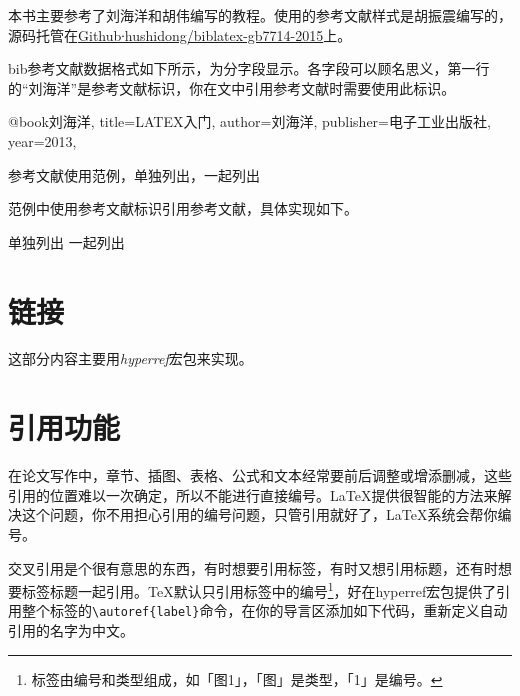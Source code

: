 本书主要参考了刘海洋\cite{刘海洋}和胡伟\cite{胡伟}编写的教程。使用的参考文献样式是胡振震编写的，源码托管在\href{https://github.com/hushidong/biblatex-gb7714-2015}{Github∙hushidong/biblatex-gb7714-2015}上。

\begin{latex}
\usepackage[
    backend=biber,%
    style=gb7714-2015%
    ]{biblatex}


\printbibliography%
\end{latex}

bib参考文献数据格式如下所示，为分字段显示。各字段可以顾名思义，第一行的“刘海洋”是参考文献标识，你在文中引用参考文献时需要使用此标识。

\begin{latex}
@book{刘海洋,
    title={LATEX入门},
    author={刘海洋},
    publisher={电子工业出版社},
    year={2013},
}
\end{latex}

参考文献使用范例，单独列出\cite{刘海洋}\cite{胡伟}，一起列出\cite{刘海洋,胡伟}

范例中使用参考文献标识引用参考文献，具体实现如下。

\begin{latex}
单独列出\cite{刘海洋}\cite{胡伟}
一起列出\cite{刘海洋,胡伟}
\end{latex}

\section{链接}
这部分内容主要用\emph{hyperref}宏包来实现。

\section{引用功能}\label{tools-ref}
在论文写作中，章节、插图、表格、公式和文本经常要前后调整或增添删减，这些引用的位置难以一次确定，所以不能进行直接编号。\LaTeX 提供很智能的方法来解决这个问题，你不用担心引用的编号问题，只管引用就好了，\LaTeX 系统会帮你编号。

交叉引用是个很有意思的东西，有时想要引用标签，有时又想引用标题，还有时想要标签标题一起引用。\TeX{}默认只引用标签中的编号\footnote{标签由编号和类型组成，如「图1」，「图」是类型，「1」是编号。}，好在hyperref宏包提供了引用整个标签的\lstinline|\autoref{label}|命令，在你的导言区添加如下代码，重新定义自动引用的名字为中文。

\begin{latex}
\end{latex}

